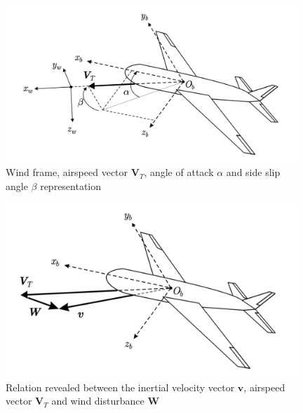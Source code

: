 \begin{figure}
\begin{center}
\includegraphics[width=11cm]{figures/windFrame}    %
\caption{Wind frame, airspeed vector $\bm{V}_T$, angle of attack $\alpha$ and side slip angle $\beta$ representation \cite{ducard2009fault}} 
\label{fig:windFrame}
\end{center}
\end{figure}

\begin{figure}
\begin{center}
\includegraphics[width=11cm]{figures/windDisturbance}    %
\caption{Relation revealed between the inertial velocity vector $\bm{v}$, airspeed vector $\bm{V}_T$ and wind disturbance $\bm{W}$ \cite{ducard2009fault}} 
\label{fig:windDisturbance}
\end{center}
\end{figure}


